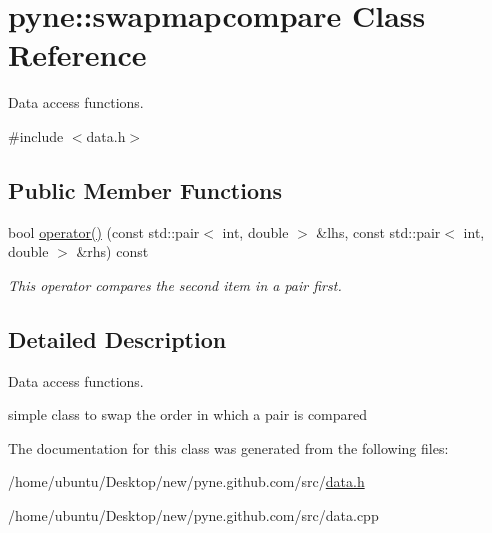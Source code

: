 \hypertarget{classpyne_1_1swapmapcompare}{}\section{pyne\+:\+:swapmapcompare Class Reference}
\label{classpyne_1_1swapmapcompare}


Data access functions.  




{\ttfamily \#include $<$data.\+h$>$}

\subsection*{Public Member Functions}
\begin{DoxyCompactItemize}
\item 
bool \hyperlink{classpyne_1_1swapmapcompare_a766adfc375aa681d00aa60ac66a1fdd9}{operator()} (const std\+::pair$<$ int, double $>$ \&lhs, const std\+::pair$<$ int, double $>$ \&rhs) const \hypertarget{classpyne_1_1swapmapcompare_a766adfc375aa681d00aa60ac66a1fdd9}{}\label{classpyne_1_1swapmapcompare_a766adfc375aa681d00aa60ac66a1fdd9}

\begin{DoxyCompactList}\small\item\em This operator compares the second item in a pair first. \end{DoxyCompactList}\end{DoxyCompactItemize}


\subsection{Detailed Description}
Data access functions. 

simple class to swap the order in which a pair is compared 

The documentation for this class was generated from the following files\+:\begin{DoxyCompactItemize}
\item 
/home/ubuntu/\+Desktop/new/pyne.\+github.\+com/src/\hyperlink{data_8h}{data.\+h}\item 
/home/ubuntu/\+Desktop/new/pyne.\+github.\+com/src/data.\+cpp\end{DoxyCompactItemize}
